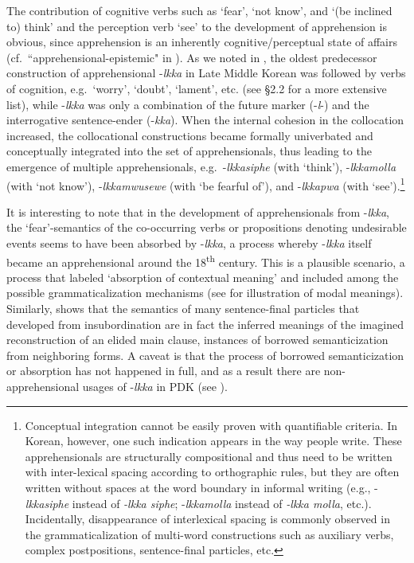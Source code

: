 \documentclass[output=paper,colorlinks,citecolor=brown]{langscibook}
\begin{document}
The contribution of cognitive verbs such as `fear', `not know', and `(be inclined to) think' and the perception verb `see' to the development of apprehension is obvious, since apprehension is an inherently cognitive/perceptual state of affairs (cf.\ ``apprehensional-epistemic" in \citet{lichtenberk1995}). As we noted in , the oldest predecessor construction of apprehensional \nobreakdash-\textit{lkka} in Late Middle Korean was followed by verbs of cognition, e.g.\  `worry', `doubt', `lament', etc. (see \textsf{§}2.2 for a more extensive list), while \nobreakdash-\textit{lkka} was only a combination of the future marker (-\textit{l}-) and the interrogative sentence-ender (-\textit{kka}). When the internal cohesion in the collocation increased, the collocational constructions became formally univerbated and conceptually integrated into the set of apprehensionals, thus leading to the emergence of multiple apprehensionals, e.g.\  \nobreakdash-\textit{lkkasiphe} (with `think'), \nobreakdash-\textit{lkkamolla} (with `not know'), \nobreakdash-\textit{lkkamwusewe} (with `be fearful of'), and \nobreakdash-\textit{lkkapwa} (with `see').\footnote{Conceptual integration cannot be easily proven with quantifiable criteria. In Korean, however, one such indication appears in the way people write. These apprehensionals are structurally compositional and thus need to be written with inter-lexical spacing according to orthographic rules, but they are often written without spaces at the word boundary in informal writing (e.g., \nobreakdash-\textit{lkkasiphe} instead of \textit{-lkka siphe}; \nobreakdash-\textit{lkkamolla} instead of \textit{-lkka molla}, etc.). Incidentally, disappearance of interlexical spacing is commonly observed in the grammaticalization of multi-word constructions such as auxiliary verbs, complex postpositions, sentence-final particles, etc.}   

It is interesting to note that in the development of apprehensionals from \nobreakdash-\textit{lkka}, the `fear'-semantics of the co-occurring verbs or propositions denoting undesirable events seems to have been absorbed by \nobreakdash-\textit{lkka}, a process whereby \nobreakdash-\textit{lkka} itself became an apprehensional around the 18\textsuperscript{th} century. This is a plausible scenario, a process that \citet{bybeeetal1994} labeled `absorption of contextual meaning' and included among the possible grammaticalization mechanisms (see \citealt[230--236]{bybeeetal1994} for illustration of modal meanings). Similarly, \citet{Rhee2017} shows that the semantics of many sentence-final particles that developed from insubordination are in fact the inferred meanings of the imagined reconstruction of an elided main clause, instances of borrowed semanticization from neighboring forms. A caveat is that the process of borrowed semanticization or absorption has not happened in full, and as a result there are non-apprehensional usages of \nobreakdash-\textit{lkka} in PDK (see ). 
\end{document}
